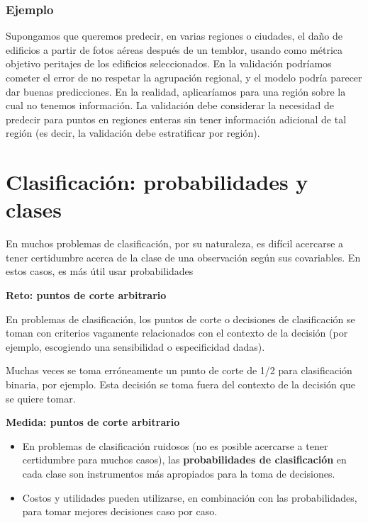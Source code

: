\documentclass[
]{book}
\providecommand{\tightlist}{%
  \setlength{\itemsep}{0pt}\setlength{\parskip}{0pt}}
\let\BeginKnitrBlock\begin \let\EndKnitrBlock\end
\begin{document}
\hypertarget{ejemplo-3}{%
\subsubsection*{Ejemplo}\label{ejemplo-3}}


Supongamos que queremos predecir, en varias regiones o ciudades, el daño de edificios a partir de fotos aéreas después de un temblor, usando como métrica objetivo peritajes de los edificios seleccionados. En la validación podríamos cometer el error de no respetar la agrupación regional, y el modelo podría parecer dar buenas predicciones. En la realidad, aplicaríamos para una región sobre la cual no tenemos información. La validación debe considerar la necesidad de predecir para puntos en regiones enteras sin tener información adicional de tal región (es decir, la validación debe estratificar por región).

\hypertarget{clasificaciuxf3n-probabilidades-y-clases}{%
\section{Clasificación: probabilidades y clases}\label{clasificaciuxf3n-probabilidades-y-clases}}

En muchos problemas de clasificación, por su naturaleza, es difícil acercarse
a tener certidumbre acerca de la clase de una observación según sus covariables. En
estos casos, es más útil usar probabilidades

\BeginKnitrBlock{rmdnote}
\textbf{Reto: puntos de corte arbitrario}

En problemas de clasificación, los puntos de corte o decisiones de clasificación
se toman con criterios vagamente relacionados con el contexto de la decisión
(por ejemplo, escogiendo una sensibilidad o especificidad dadas).
\EndKnitrBlock{rmdnote}

Muchas veces
se toma erróneamente un punto de corte de 1/2 para clasificación binaria, por ejemplo. Esta decisión se toma fuera del contexto de la decisión que se quiere tomar.

\BeginKnitrBlock{rmdtip}
\textbf{Medida: puntos de corte arbitrario}

\begin{itemize}
\tightlist
\item
  En problemas de clasificación ruidosos (no es posible acercarse a tener certidumbre para muchos casos), las \textbf{probabilidades de clasificación} en cada clase son instrumentos más apropiados para la toma de decisiones.
\item
  Costos y utilidades pueden utilizarse, en combinación con las probabilidades, para tomar mejores decisiones caso por caso.
\end{itemize}
\EndKnitrBlock{rmdtip}
\end{document}
